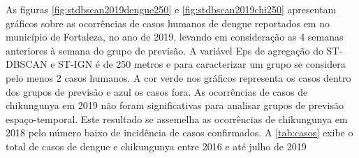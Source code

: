 As figuras \ref{fig:stdbscan2019dengue250} e \ref{fig:stdbscan2019chi250} apresentam gráficos sobre as ocorrências de casos humanos de dengue reportados em \cite{simda} no município de Fortaleza, no ano de 2019, levando em consideração as 4 semanas anteriores à semana do grupo de previsão. A variável Eps de agregação do \acrshort{ST-DBSCAN} e ST-IGN é de 250 metros e para caracterizar um grupo se considera pelo menos 2 casos humanos. A cor verde nos gráficos representa os casos dentro dos grupos de previsão e azul os casos fora. As ocorrências de casos de chikungunya em 2019 não foram significativas para analisar grupos de previsão espaço-temporal. Este resultado se assemelha as ocorrências de chikungunya em 2018 pelo número baixo de incidência de casos confirmados. A \ref{tab:casos} exibe o total de casos de dengue e chikungunya entre 2016 e até julho de 2019

\begin{table}[ht!]	
	\centering
\end{table}

\begin{figure}[!ht]
	\centering	
\end{figure}
\FloatBarrier

\begin{figure}[!ht]
	\centering	
\end{figure}
\FloatBarrier

